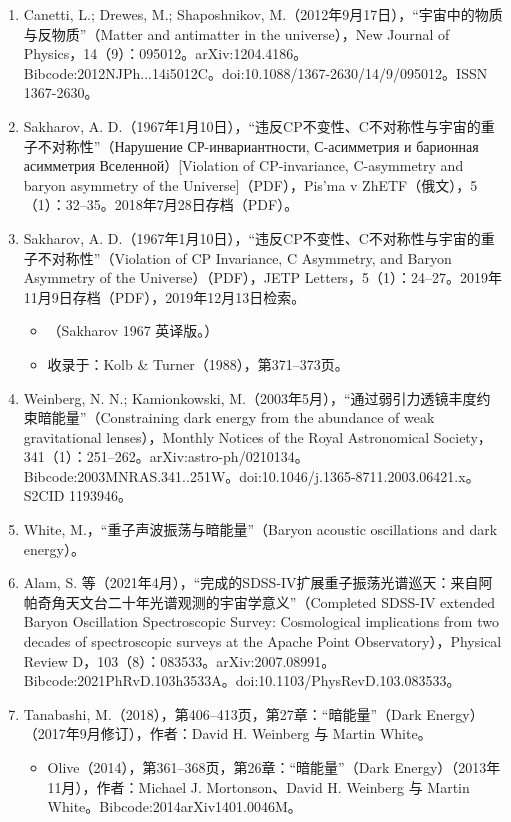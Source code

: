 \begin{enumerate}
\item Canetti, L.; Drewes, M.; Shaposhnikov, M.（2012年9月17日），“宇宙中的物质与反物质”（Matter and antimatter in the universe），New Journal of Physics，14（9）：095012。arXiv:1204.4186。Bibcode:2012NJPh...14i5012C。doi:10.1088/1367-2630/14/9/095012。ISSN 1367-2630。  
\item Sakharov, A. D.（1967年1月10日），“违反CP不变性、C不对称性与宇宙的重子不对称性”（Нарушение СР-инвариантности, С-асимметрия и барионная асимметрия Вселенной）[Violation of CP-invariance, C-asymmetry and baryon asymmetry of the Universe]（PDF），Pis’ma v ZhETF（俄文），5（1）：32–35。2018年7月28日存档（PDF）。
\item Sakharov, A. D.（1967年1月10日），“违反CP不变性、C不对称性与宇宙的重子不对称性”（Violation of CP Invariance, C Asymmetry, and Baryon Asymmetry of the Universe）（PDF），JETP Letters，5（1）：24–27。2019年11月9日存档（PDF），2019年12月13日检索。  
\begin{itemize}
\item （Sakharov 1967 英译版。）  
\item 收录于：Kolb & Turner（1988），第371–373页。  
\end{itemize}
\item Weinberg, N. N.; Kamionkowski, M.（2003年5月），“通过弱引力透镜丰度约束暗能量”（Constraining dark energy from the abundance of weak gravitational lenses），Monthly Notices of the Royal Astronomical Society，341（1）：251–262。arXiv:astro-ph/0210134。Bibcode:2003MNRAS.341..251W。doi:10.1046/j.1365-8711.2003.06421.x。S2CID 1193946。  
\item White, M.，“重子声波振荡与暗能量”（Baryon acoustic oscillations and dark energy）。  
\item Alam, S. 等（2021年4月），“完成的SDSS-IV扩展重子振荡光谱巡天：来自阿帕奇角天文台二十年光谱观测的宇宙学意义”（Completed SDSS-IV extended Baryon Oscillation Spectroscopic Survey: Cosmological implications from two decades of spectroscopic surveys at the Apache Point Observatory），Physical Review D，103（8）：083533。arXiv:2007.08991。Bibcode:2021PhRvD.103h3533A。doi:10.1103/PhysRevD.103.083533。  
\item Tanabashi, M.（2018），第406–413页，第27章：“暗能量”（Dark Energy）（2017年9月修订），作者：David H. Weinberg 与 Martin White。  
\begin{itemize}
\item Olive（2014），第361–368页，第26章：“暗能量”（Dark Energy）（2013年11月），作者：Michael J. Mortonson、David H. Weinberg 与 Martin White。Bibcode:2014arXiv1401.0046M。

\end{itemize}
\end{enumerate}
